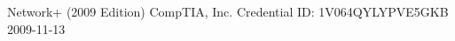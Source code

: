 \awarditem
    {Network+ (2009 Edition)}
    {CompTIA, Inc.}
    {Credential ID: 1V064QYLYPVE5GKB}
    {2009-11-13}
